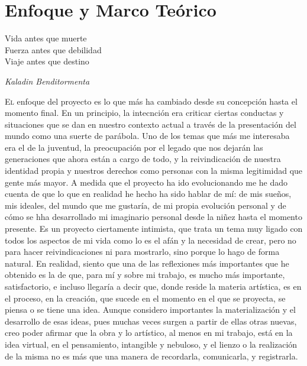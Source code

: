 \documentclass[twoside]{article}
\begin{document}
\begin{multicols}{2}
\end{multicols}

\newpage
\hypertarget{enfoque}{%
  \section{Enfoque y Marco Teórico}\label{enfoque}}
\epigraph{Vida antes que muerte\\Fuerza antes que debilidad\\Viaje antes que destino}{\textit{Kaladin Benditormenta}}
\begin{multicols}{2}

  \lettrine[nindent=0em,lines=3]{E}l enfoque del proyecto es lo que más ha cambiado desde su concepción
  hasta el momento final. En un principio, la intecnción era criticar
  ciertas conductas y situaciones que se dan en nuestro contexto actual a
  través de la presentación del mundo como una suerte de parábola. Uno de
  los temas que más me interesaba era el de la juventud, la preocupación
  por el legado que nos dejarán las generaciones que ahora están a cargo
  de todo, y la reivindicación de nuestra identidad propia y nuestros
  derechos como personas con la misma legitimidad que gente más mayor. A
  medida que el proyecto ha ido evolucionando me he dado cuenta de que lo
  que en realidad he hecho ha sido hablar de mí: de mis sueños, mis
  ideales, del mundo que me gustaría, de mi propia evolución personal y de
  cómo se hha desarrollado mi imaginario personal desde la niñez hasta el
  momento presente. Es un proyecto ciertamente intimista, que trata un
  tema muy ligado con todos los aspectos de mi vida como lo es el afán y
  la necesidad de crear, pero no para hacer reivindicaciones ni para
  mostrarlo, sino porque lo hago de forma natural. En realidad, siento que
  una de las reflexiones más importantes que he obtenido es la de que,
  para mí y sobre mi trabajo, es mucho más importante, satisfactorio, e
  incluso llegaría a decir que, donde reside la materia artística, es en
  el proceso, en la creación, que sucede en el momento en el que se
  proyecta, se piensa o se tiene una idea. Aunque considero importantes la
  materialización y el desarrollo de esas ideas, pues muchas veces surgen
  a partir de ellas otras nuevas, creo poder afirmar que la obra y lo
  artístico, al menos en mi trabajo, está en la idea virtual, en el
  pensamiento, intangible y nebuloso, y el lienzo o la realización de la
  misma no es más que una manera de recordarla, comunicarla, y
  registrarla.


\end{multicols}
\end{document}
